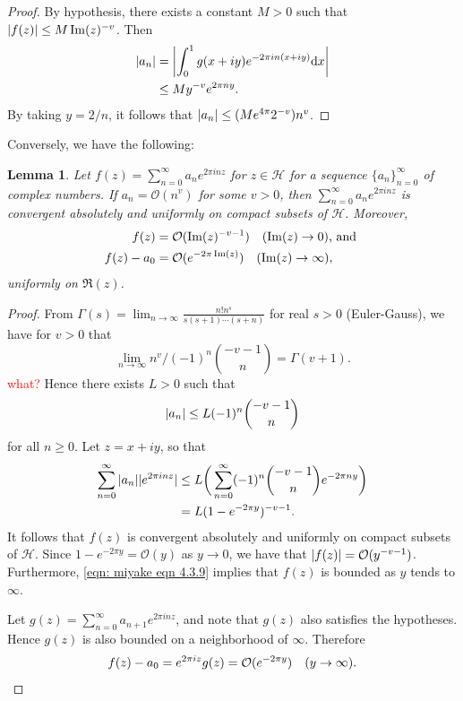 \documentclass[10pt,leqno,twoside]{article}
\theoremstyle{plain}
\newtheorem{lemma}[lem]{Lemma}
\theoremstyle{definition}
\numberwithin{equation}{section}
\numberwithin{lem}{section}
\newcommand{\sai}[1]{\textcolor{red}{#1}}
\begin{document}
\begin{proof}
    By hypothesis, there exists a constant $M>0$ such that $\abs{f(z)}\leq M\Im(z)^{-v}$. Then \begin{align*}
        \abs{a_n} &= \abs{\int_0^1 g(x+iy)e^{-2\pi i n (x+iy)}\dd x}\\
        &\leq My^{-v}e^{2\pi n y}.
    \end{align*} By taking $y = 2/n$, it follows that $\abs{a_n} \leq (Me^{4\pi}2^{-v})n^v$.
\end{proof} Conversely, we have the following:
\begin{lemma}\label{lem: miyake lem 4.3.3}
    Let $f(z) = \sum_{n=0}^\infty a_ne^{2\pi i nz}$ for $z\in \mathcal H$ for a sequence $\{a_n\}_{n=0}^\infty$ of complex numbers. If $a_n = \mathcal O(n^v)$ for some $v >0$, then $\sum_{n=0}^\infty a_ne^{2\pi i nz}$ is convergent absolutely and uniformly on compact subsets of $\mathcal H$. Moreover, 
    \begin{align*}
        f(z) &= \mathcal O(\Im(z)^{-v-1}) \quad\textup{($\Im(z) \to 0$), and }\\
        f(z) - a_0 &= \mathcal O(e^{-2\pi \Im(z)}) \quad\textup{($\Im(z) \to \infty$)},
    \end{align*}
    uniformly on $\Re(z)$.
\end{lemma}
\begin{proof}
    From $\varGamma(s) = \lim_{n\to \infty}\frac{n!n^s}{s(s+1)\cdots(s+n)}$ for real $s>0$ (Euler-Gauss), we have for $v>0$ that
    \[\lim_{n\to\infty} n^v/(-1)^n\binom{-v-1}{n} = \varGamma(v+1).\]\sai{what?}
    Hence there exists $L>0$ such that 
    \[\abs{a_n}\leq L(-1)^n\binom{-v-1}{n}\] for all $n\geq 0$. Let $z = x+iy$, so that 
    \begin{align}\label{eqn: miyake eqn 4.3.9}
        \sum_{n=0}^\infty\abs{a_n}|e^{2\pi i n z}|&\leq L\bigg(\sum_{n=0}^\infty (-1)^n\binom{-v-1}{n}e^{-2\pi n y}\bigg)\\
        &= L(1-e^{-2\pi y})^{-v-1}.\nonumber
    \end{align}
    It follows that $f(z)$ is convergent absolutely and uniformly on compact subsets of $\mathcal H$. Since $1-e^{-2\pi y} = \mathcal O(y)$ as $y\to 0$, we have that $\abs{f(z)} = \mathcal O(y^{-v-1})$. Furthermore, \cref{eqn: miyake eqn 4.3.9} implies that $f(z)$ is bounded as $y$ tends to $\infty$.

    Let $g(z) = \sum_{n=0}^\infty a_{n+1}e^{2\pi i nz}$, and note that $g(z)$ also satisfies the hypotheses. Hence $g(z)$ is also bounded on a neighborhood of $\infty$. Therefore 
    \[f(z)-a_0 = e^{2\pi i z}g(z) = \mathcal O(e^{-2\pi y})\quad (y\to \infty).\qedhere\]
\end{proof}
\end{document}
